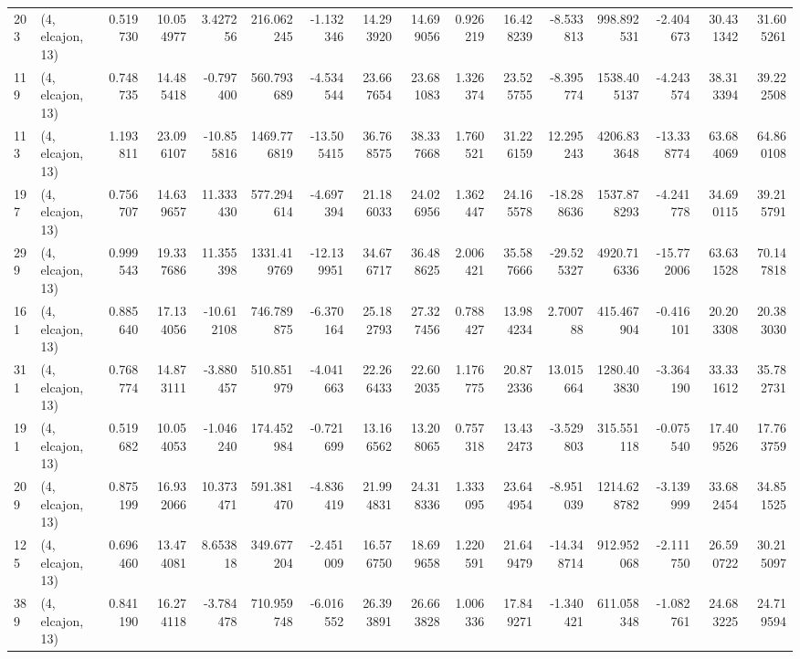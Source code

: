 \begin{tabular}{llrrrrrrrrrrrrrr}
203 &  (4, elcajon, 13) &   0.519730 &  10.054977 &   3.427256 &   216.062245 &  -1.132346 &  14.293920 &  14.699056 &  0.926219 &  16.428239 &  -8.533813 &   998.892531 &  -2.404673 &  30.431342 &  31.605261 \\
119 &  (4, elcajon, 13) &   0.748735 &  14.485418 &  -0.797400 &   560.793689 &  -4.534544 &  23.667654 &  23.681083 &  1.326374 &  23.525755 &  -8.395774 &  1538.405137 &  -4.243574 &  38.313394 &  39.222508 \\
113 &  (4, elcajon, 13) &   1.193811 &  23.096107 & -10.855816 &  1469.776819 & -13.505415 &  36.768575 &  38.337668 &  1.760521 &  31.226159 &  12.295243 &  4206.833648 & -13.338774 &  63.684069 &  64.860108 \\
197 &  (4, elcajon, 13) &   0.756707 &  14.639657 &  11.333430 &   577.294614 &  -4.697394 &  21.186033 &  24.026956 &  1.362447 &  24.165578 & -18.288636 &  1537.878293 &  -4.241778 &  34.690115 &  39.215791 \\
299 &  (4, elcajon, 13) &   0.999543 &  19.337686 &  11.355398 &  1331.419769 & -12.139951 &  34.676717 &  36.488625 &  2.006421 &  35.587666 & -29.525327 &  4920.716336 & -15.772006 &  63.631528 &  70.147818 \\
161 &  (4, elcajon, 13) &   0.885640 &  17.134056 & -10.612108 &   746.789875 &  -6.370164 &  25.182793 &  27.327456 &  0.788427 &  13.984234 &   2.700788 &   415.467904 &  -0.416101 &  20.203308 &  20.383030 \\
311 &  (4, elcajon, 13) &   0.768774 &  14.873111 &  -3.880457 &   510.851979 &  -4.041663 &  22.266433 &  22.602035 &  1.176775 &  20.872336 &  13.015664 &  1280.403830 &  -3.364190 &  33.331612 &  35.782731 \\
191 &  (4, elcajon, 13) &   0.519682 &  10.054053 &  -1.046240 &   174.452984 &  -0.721699 &  13.166562 &  13.208065 &  0.757318 &  13.432473 &  -3.529803 &   315.551118 &  -0.075540 &  17.409526 &  17.763759 \\
209 &  (4, elcajon, 13) &   0.875199 &  16.932066 &  10.373471 &   591.381470 &  -4.836419 &  21.994831 &  24.318336 &  1.333095 &  23.644954 &  -8.951039 &  1214.628782 &  -3.139999 &  33.682454 &  34.851525 \\
125 &  (4, elcajon, 13) &   0.696460 &  13.474081 &   8.653818 &   349.677204 &  -2.451009 &  16.576750 &  18.699658 &  1.220591 &  21.649479 & -14.348714 &   912.952068 &  -2.111750 &  26.590722 &  30.215097 \\
389 &  (4, elcajon, 13) &   0.841190 &  16.274118 &  -3.784478 &   710.959748 &  -6.016552 &  26.393891 &  26.663828 &  1.006336 &  17.849271 &  -1.340421 &   611.058348 &  -1.082761 &  24.683225 &  24.719594 \\

\end{tabular}
